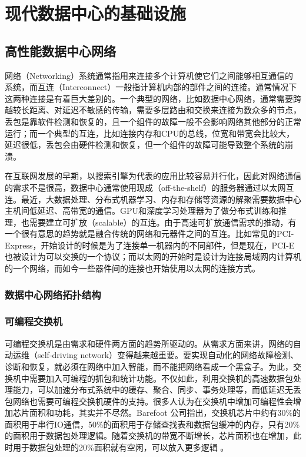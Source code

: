 \iffalse
\section{现代数据中心的基础设施}

\subsection{高性能数据中心网络}

网络（Networking）系统通常指用来连接多个计算机使它们之间能够相互通信的系统，而互连（Interconnect）一般指计算机内部的部件之间的连接。通常情况下这两种连接是有着巨大差别的。一个典型的网络，比如数据中心网络，通常需要跨越较长距离、对延迟不敏感的传输，需要多层路由和交换来连接为数众多的节点，丢包是靠软件检测和恢复的，且一个组件的故障一般不会影响网络其他部分的正常运行；而一个典型的互连，比如连接内存和CPU的总线，位宽和带宽会比较大，延迟很低，丢包会由硬件检测和恢复，但一个组件的故障可能导致整个系统的崩溃。

在互联网发展的早期，以搜索引擎为代表的应用比较容易并行化，因此对网络通信的需求不是很高，数据中心通常使用现成（off-the-shelf）的服务器通过以太网互连。最近，大数据处理、分布式机器学习、内存和存储等资源的解聚需要数据中心主机间低延迟、高带宽的通信。GPU和深度学习处理器为了做分布式训练和推理，也需要建立可扩放（scalable）的互连。由于高速可扩放通信需求的推动，有一个很有意思的趋势就是融合传统的网络和元器件之间的互连。比如常见的PCI-Express，开始设计的时候是为了连接单一机器内的不同部件，但是现在，PCI-E也被设计为可以交换的一个协议；而以太网的开始时是设计为连接局域网内计算机的一个网络，而如今一些器件间的连接也开始使用以太网的连接方式。

\subsubsection{数据中心网络拓扑结构}



\subsubsection{可编程交换机}

可编程交换机是由需求和硬件两方面的趋势所驱动的。从需求方面来讲，网络的自动运维（self-driving network）变得越来越重要。要实现自动化的网络故障检测、诊断和恢复，就必须在网络中加入智能，而不能把网络看成一个黑盒子。为此，交换机中需要加入可编程的抓包和统计功能。不仅如此，利用交换机的高速数据包处理能力，可以加速分布式系统中的缓存、聚合、同步、事务处理等，而低延迟无丢包网络也需要可编程交换机硬件的支持。很多人认为在交换机中增加可编程性会增加芯片面积和功耗，其实并不尽然。Barefoot 公司指出，交换机芯片中约有30\%的面积用于串行IO通信，50\%的面积用于存储查找表和数据包缓冲的内存，只有20\%的面积用于数据包处理逻辑。随着交换机的带宽不断增长，芯片面积也在增加，此时用于数据包处理的20\%面积就有空闲，可以放入更多逻辑 \cite{barefoot-programmable}。

